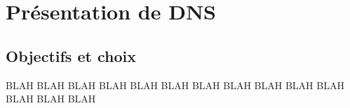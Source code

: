\chapter{Présentation de DNS}
\section{Objectifs et choix}
BLAH BLAH BLAH BLAH BLAH BLAH BLAH BLAH BLAH BLAH BLAH BLAH BLAH BLAH 
